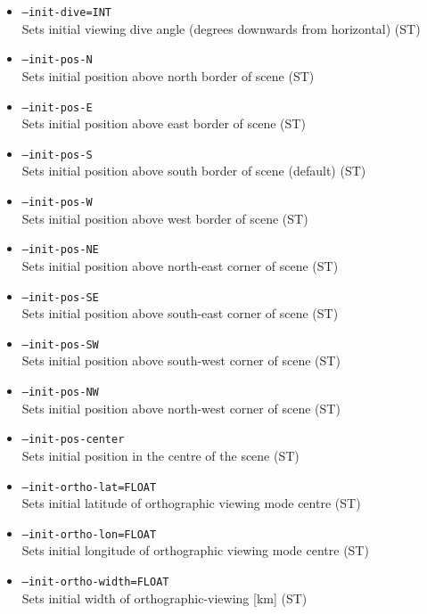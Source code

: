 \begin{itemize}
\item \texttt{--init-dive=INT } \\
Sets initial viewing dive angle (degrees downwards from horizontal) (ST)

\item \texttt{--init-pos-N} \\
Sets initial position above north border of scene (ST)

\item \texttt{--init-pos-E} \\
Sets initial position above east border of scene (ST)

\item \texttt{--init-pos-S} \\
Sets initial position above south border of scene (default) (ST)

\item \texttt{--init-pos-W} \\
Sets initial position above west border of scene (ST)

\item \texttt{--init-pos-NE} \\
Sets initial position above north-east corner of scene (ST)

\item \texttt{--init-pos-SE} \\
Sets initial position above south-east corner of scene (ST)

\item \texttt{--init-pos-SW} \\
Sets initial position above south-west corner of scene (ST)

\item \texttt{--init-pos-NW} \\
Sets initial position above north-west corner of scene (ST)

\item \texttt{--init-pos-center} \\
Sets initial position in the centre of the scene (ST)

\item \texttt{--init-ortho-lat=FLOAT} \\
Sets initial latitude of orthographic viewing mode centre (ST)

\item \texttt{--init-ortho-lon=FLOAT} \\
Sets initial longitude of orthographic viewing mode centre (ST)

\item \texttt{--init-ortho-width=FLOAT} \\
Sets initial width of orthographic-viewing [km] (ST)


\end{itemize}
